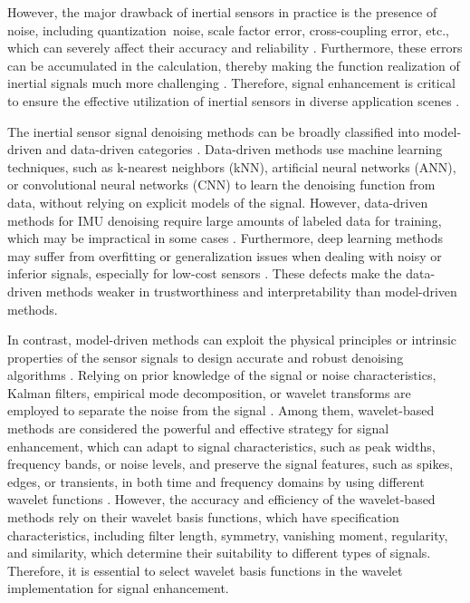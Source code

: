 \documentclass[letterpaper]{article} %
\begin{document}
	However, the major drawback of inertial sensors in practice is the presence of noise, including quantization noise, scale factor error, cross-coupling error, etc., which can severely affect their accuracy and reliability \cite{chen2020deep}.
	Furthermore, these errors can be accumulated in the calculation, thereby making the function realization of inertial signals much more challenging \cite{10080916, saha2022tinyodom, saha2023inertial}.
	Therefore, signal enhancement is critical to ensure the effective utilization of inertial sensors in diverse application scenes \cite{caesar2020nuscenes}. 
	
	The inertial sensor signal denoising methods can be broadly classified into model-driven and data-driven categories \cite{golestani2020human}. Data-driven methods use machine learning techniques, such as k-nearest neighbors (kNN), artificial neural networks (ANN), or convolutional neural networks (CNN) \cite{engelsman2023data} to learn the denoising function from data, without relying on explicit models of the signal.
	However, data-driven methods for IMU denoising require large amounts of labeled data for training, which may be impractical in some cases \cite{herath2020ronin}. Furthermore, deep learning methods may suffer from overfitting or generalization issues when dealing with noisy or inferior signals, especially for low-cost sensors \cite{yuan2023simple}. These defects make the data-driven methods weaker in trustworthiness and interpretability than model-driven methods.
	
	In contrast, model-driven methods can exploit the physical principles or intrinsic properties of the sensor signals \cite{9119813} to design accurate and robust denoising algorithms \cite{min2021drop}. Relying on prior knowledge of the signal or noise characteristics, Kalman filters, empirical mode decomposition, or wavelet transforms are employed to separate the noise from the signal \cite{liu2020denoising,he2019noise}. Among them, wavelet-based methods are considered the powerful and effective strategy for signal enhancement, which can adapt to signal characteristics, such as peak widths, frequency bands, or noise levels, and preserve the signal features, such as spikes, edges, or transients, in both time and frequency domains by using different wavelet functions \cite{saydjari2022equivariant}. However, the accuracy and efficiency of the wavelet-based methods rely on their wavelet basis functions, which have specification characteristics, including filter length, symmetry, vanishing moment, regularity, and similarity, which determine their suitability to different types of signals. Therefore, it is essential to select wavelet basis functions in the wavelet implementation for signal enhancement.
	
\end{document}
